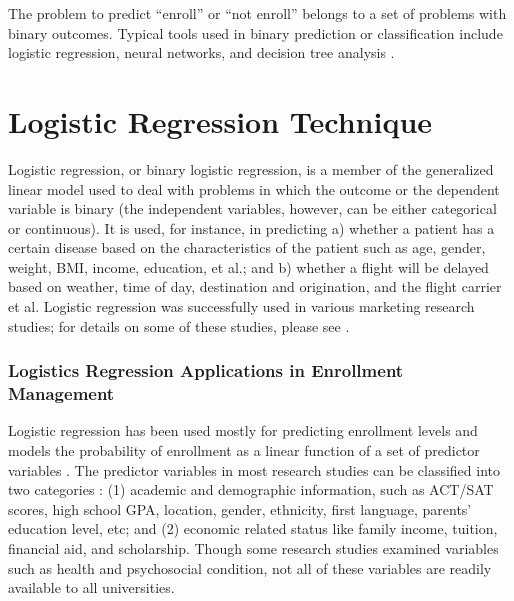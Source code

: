 \documentclass[12pt,english]{report}
\begin{document}
The problem to predict ``enroll'' or ``not enroll'' belongs to a set of problems with binary outcomes.  Typical tools used in binary prediction or classification include logistic regression, neural networks, and decision tree analysis \citep{han2011data}.

\section{Logistic Regression Technique}

Logistic regression, or binary logistic regression, is a member of the generalized linear model used to deal with problems in which the outcome or the dependent variable is binary (the independent variables, however,  can be either categorical or continuous). It is used, for instance, in predicting a) whether a patient has a certain disease based on the characteristics of the patient such as age, gender, weight, BMI, income, education, et al.; and b) whether a flight will be delayed based on weather, time of day, destination and origination, and the flight carrier et al. Logistic regression was successfully used in various marketing research studies; for details on some of these studies, please see \citep{logistic_application1,logistic_application2,logistic_application3,logistic_application4,logistic_application5,logistic_application6,logistic_application7,logistic_application8,logistic_application9,logistic_application10,logistic_application11,logistic_application12,logistic_application13}. 

\subsubsection{Logistics Regression Applications in Enrollment Management}
Logistic regression has been used mostly for predicting enrollment levels and models the probability of enrollment as a linear function of a set of predictor variables \citep{lr_summary}. The predictor variables in most research studies can be classified into two categories \citep{braunstein1999measuring}: (1) academic and demographic information, such as ACT/SAT scores, high school GPA, location, gender, ethnicity, first language, parents' education level, etc; and (2) economic related status like family income, tuition, financial aid, and scholarship. Though some research studies examined variables such as health and psychosocial condition, not all of these variables are readily available to all universities. 
\end{document}
